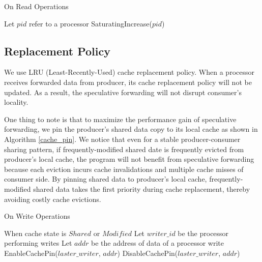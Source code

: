 \documentclass[conference]{IEEEtran}
\begin{document}
\begin{algorithm}
\caption{On Read Operations}
\label{read_operations}
\begin{algorithmic}[1]
\State Let $pid$ refer to a processor
    \State SaturatingIncrease($pid$) 
\EndFor
\end{algorithmic}
\end{algorithm}


\subsection{Replacement Policy}
We use LRU (Least-Recently-Used) cache replacement policy. When a processor receives forwarded data from producer, its cache replacement policy will not be updated. As a result, the speculative forwarding will not disrupt consumer's locality.

One thing to note is that to maximize the performance gain of speculative forwarding, we pin the producer's shared data copy to its local cache as shown in Algorithm \ref{cache_pin}. We notice that even for a stable producer-consumer sharing pattern, if frequently-modified shared date is frequently evicted from producer's local cache, the program will not benefit from speculative forwarding because each eviction incurs cache invalidations and multiple cache misses of consumer side. By pinning shared data to producer's local cache, frequently-modified shared data takes the first priority during cache replacement, thereby avoiding costly cache evictions.

\begin{algorithm}
\caption{On Write Operations}
\label{cache_pin}
\begin{algorithmic}[1]
\State When cache state is $Shared$ or $Modified$
\State Let $writer\_id$ be the processor performing writes
\State Let $addr$ be the address of data of a processor write
    \State EnableCachePin($laster\_writer$, $addr$)
\Else
    \State DisableCachePin($laster\_writer$, $addr$)
\EndIf
\end{algorithmic}
\end{algorithm}
\end{document}
